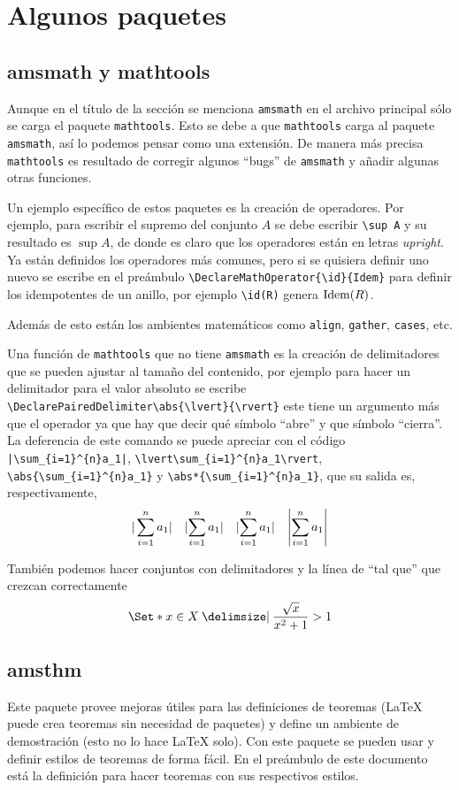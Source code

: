 
\chapter{Algunos paquetes}

\section{amsmath y mathtools}
Aunque en el título de la sección se menciona \texttt{amsmath} en el archivo
principal sólo se carga el paquete \texttt{mathtools}. Esto se debe a que
\texttt{mathtools} carga al paquete \texttt{amsmath}, así lo podemos pensar
como una extensión. De manera más precisa \texttt{mathtools} es resultado de
corregir algunos ``bugs'' de \texttt{amsmath} y añadir algunas otras funciones.

Un ejemplo específico de estos paquetes es la creación de operadores. Por
ejemplo, para escribir el supremo del conjunto \(A\) se debe escribir
\verb|\sup A| y su resultado es \(\sup A\), de donde es claro que los
operadores están en letras \textit{upright}. Ya están definidos los
operadores más comunes, pero si se quisiera definir uno nuevo se escribe en
el preámbulo \verb|\DeclareMathOperator{\id}{Idem}| para definir los
idempotentes de un anillo, por ejemplo \verb|\id(R)| genera \(\id(R)\).

Además de esto están los ambientes matemáticos como \texttt{align},
\texttt{gather}, \texttt{cases}, etc.

Una función de \texttt{mathtools} que no tiene \texttt{amsmath} es la creación
de delimitadores que se pueden ajustar al tamaño del contenido, por ejemplo
para hacer un delimitador para el valor absoluto se escribe
\verb|\DeclarePairedDelimiter\abs{\lvert}{\rvert}| este
tiene un argumento más que el operador ya que hay que decir qué símbolo
``abre'' y que símbolo ``cierra''. La deferencia de este comando se puede
apreciar con el código \verb!|\sum_{i=1}^{n}a_1|!,
\verb|\lvert\sum_{i=1}^{n}a_1\rvert|, \verb|\abs{\sum_{i=1}^{n}a_1}| y
\verb|\abs*{\sum_{i=1}^{n}a_1}|, que su salida es, respectivamente,
\[
  |\sum_{i=1}^{n}a_1| \quad \lvert\sum_{i=1}^{n}a_1\rvert \quad
  \abs{\sum_{i=1}^{n}a_1} \quad \abs*{\sum_{i=1}^{n}a_1}
\]

También podemos hacer conjuntos con delimitadores y la línea de ``tal que''
que crezcan correctamente
\[
  \Set*{ x \in X \given \frac{\sqrt{x}}{x^2+1} > 1 }
\]


\section{amsthm}
Este paquete provee mejoras útiles para las definiciones de teoremas
(\LaTeX{} puede crea teoremas sin necesidad de paquetes) y
define un ambiente de demostración (esto no lo hace \LaTeX{} solo). Con este
paquete se pueden usar y definir estilos de teoremas de forma fácil. En el
preámbulo de este documento está la definición para hacer teoremas con sus
respectivos estilos.


